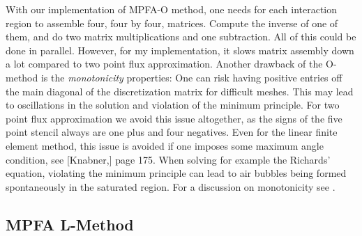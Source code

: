 \documentclass[../Main/main.tex]{subfiles}
\begin{document}
	With our implementation of MPFA-O method, one needs for each interaction region to assemble four, four by four, matrices. Compute the inverse of one of them, and do two matrix multiplications and one subtraction. All of this could be done in parallel. However, for my implementation, it slows matrix assembly down a lot compared to two point flux approximation. Another drawback of the O-method is the \emph{monotonicity} properties: One can risk having positive entries off the main diagonal of the discretization matrix for difficult meshes. This may lead to oscillations in the solution and violation of the minimum principle. For two point flux approximation we avoid this issue altogether, as the signs of the five point stencil always are one plus and four negatives. Even for the linear finite element method, this issue is avoided if one imposes some maximum angle condition, see [Knabner,\cite{Knabner}] page 175. When solving for example the Richards' equation, violating the minimum principle can lead to air bubbles being formed spontaneously in the saturated region. For a discussion on monotonicity see \cite{10.1007/s00211-006-0060-z}.
	\subsection{MPFA L-Method}
\end{document}
